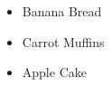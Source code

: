\documentclass{article}
\begin{document}
\begin{itemize} %
	\item Banana Bread
	\item Carrot Muffins
	\item Apple Cake 
\end{itemize}	
\end{document}
